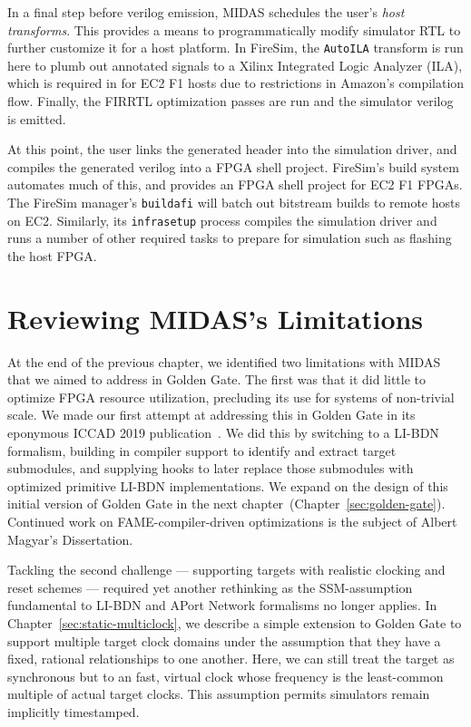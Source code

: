 In a final step before verilog emission, MIDAS schedules the user's
\emph{host transforms}.  This provides a means to programmatically modify simulator RTL to further
customize it for a host platform. In FireSim, the \texttt{AutoILA}
transform is run here to plumb out annotated signals to a Xilinx Integrated
Logic Analyzer (ILA), which is required in for EC2 F1 hosts due to
restrictions in Amazon's compilation flow. Finally, the FIRRTL optimization passes are run
and the simulator verilog is emitted.

At this point, the user links the generated header into the simulation
driver, and compiles the generated verilog into a FPGA shell project.
FireSim's build system automates much of this, and provides an FPGA shell
project for EC2 F1 FPGAs. The FireSim manager's \texttt{buildafi} will batch
out bitstream builds to remote hosts on EC2. Similarly, its
\texttt{infrasetup} process compiles the simulation driver and runs a number of
other required tasks to prepare for simulation such as flashing the host FPGA.

\section{Reviewing MIDAS's Limitations}

At the end of the previous chapter, we identified two limitations with MIDAS
that we aimed to address in Golden Gate. The first was that it did little to
optimize FPGA resource utilization, precluding its use for systems of
non-trivial scale. We made our first attempt at addressing this in Golden Gate
in its eponymous ICCAD 2019 publication~\cite{Golden Gate}. We did this by
switching to a LI-BDN formalism, building in compiler support to identify and
extract target submodules, and supplying hooks to later replace those
submodules with optimized primitive LI-BDN implementations. We expand on the
design of this initial version of Golden Gate in the next
chapter~(Chapter~\ref{sec:golden-gate}). Continued work on FAME-compiler-driven
optimizations is the subject of Albert Magyar's Dissertation.

Tackling the second challenge --- supporting targets
with realistic clocking and reset schemes --- required yet another
rethinking as the SSM-assumption fundamental to LI-BDN and APort Network
formalisms no longer applies. In Chapter~\ref{sec:static-multiclock}, we
describe a simple extension to Golden Gate to support multiple target clock
domains under the assumption that they have a fixed, rational relationships to one another.
Here, we can still treat the target as synchronous but to an
fast, virtual clock whose frequency is the least-common multiple
of actual target clocks. This assumption permits simulators remain implicitly
timestamped.

